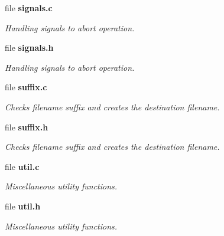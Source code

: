 \begin{DoxyCompactItemize}
file \textbf{ signals.\+c}
\begin{DoxyCompactList}\small\item\em Handling signals to abort operation. \end{DoxyCompactList}\item 
file \textbf{ signals.\+h}
\begin{DoxyCompactList}\small\item\em Handling signals to abort operation. \end{DoxyCompactList}\item 
file \textbf{ suffix.\+c}
\begin{DoxyCompactList}\small\item\em Checks filename suffix and creates the destination filename. \end{DoxyCompactList}\item 
file \textbf{ suffix.\+h}
\begin{DoxyCompactList}\small\item\em Checks filename suffix and creates the destination filename. \end{DoxyCompactList}\item 
file \textbf{ util.\+c}
\begin{DoxyCompactList}\small\item\em Miscellaneous utility functions. \end{DoxyCompactList}\item 
file \textbf{ util.\+h}
\begin{DoxyCompactList}\small\item\em Miscellaneous utility functions. \end{DoxyCompactList}\end{DoxyCompactItemize}
